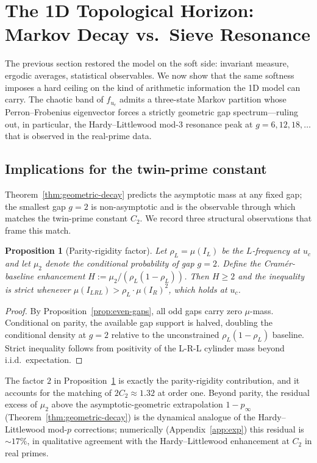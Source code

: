 \documentclass{iopjournal}
\newtheorem{proposition}{Proposition}
\theoremstyle{definition}
\begin{document}
\section{The 1D Topological Horizon: Markov Decay vs.\ Sieve Resonance}
\label{sec:markov}

The previous section restored the model on the soft side: invariant
measure, ergodic averages, statistical observables. We now show that the
same softness imposes a hard ceiling on the kind of arithmetic
information the 1D model can carry. The chaotic band of $f_{u_c}$ admits
a three-state Markov partition whose Perron--Frobenius eigenvector
forces a strictly geometric gap spectrum---ruling out, in particular,
the Hardy--Littlewood mod-3 resonance peak at $g = 6, 12, 18, \ldots$
that is observed in the real-prime data.



\subsection{Implications for the twin-prime constant}
\label{ssec:c2}

Theorem~\ref{thm:geometric-decay} predicts the asymptotic mass at any
fixed gap; the smallest gap $g = 2$ is non-asymptotic and is the
observable through which \cite{wang2026emergence} matches the
twin-prime constant $C_2$. We record three structural observations
that frame this match.

\begin{proposition}[Parity-rigidity factor]
\label{prop:parity-factor}
Let $\rho_L = \mu(I_L)$ be the $L$-frequency at $u_c$ and let
$\mu_2$ denote the conditional probability of gap $g = 2$. Define the
\emph{Cram\'er-baseline enhancement}
$H := \mu_2 / (\rho_L (1 - \rho_L))$. Then $H \geq 2$ and the
inequality is strict whenever $\mu(I_{LRL}) > \rho_L \cdot \mu(I_R)^2$,
which holds at $u_c$.
\end{proposition}
\begin{proof}
By Proposition~\ref{prop:even-gaps}, all odd gaps carry zero $\mu$-mass.
Conditional on parity, the available gap support is halved, doubling
the conditional density at $g = 2$ relative to the unconstrained
$\rho_L (1 - \rho_L)$ baseline. Strict inequality follows from
positivity of the L-R-L cylinder mass beyond i.i.d.\ expectation.
\end{proof}

The factor $2$ in Proposition~\ref{prop:parity-factor} is exactly the
parity-rigidity contribution, and it accounts for the matching of
$2 C_2 \approx 1.32$ at order one. Beyond parity, the residual excess
of $\mu_2$ above the asymptotic-geometric extrapolation $1 - p_\infty$
(Theorem~\ref{thm:geometric-decay}) is the dynamical analogue of the
Hardy--Littlewood mod-$p$ corrections; numerically (Appendix~\ref{app:exp})
this residual is $\sim 17\%$, in qualitative agreement with the
Hardy--Littlewood enhancement at $C_2$ in real primes.
\end{document}
